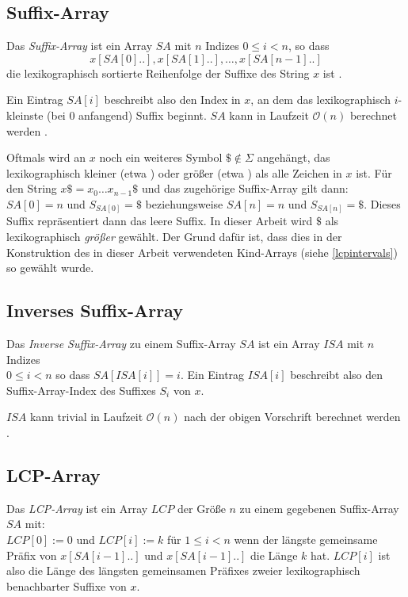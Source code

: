 \subsection{Suffix-Array}

Das \emph{Suffix-Array} ist ein Array $SA$ mit $n$ Indizes $0 \leq i < n$, so dass 
\begin{equation*}
	x[SA[0]..], x[SA[1]..], \dots, x[SA[n-1]..]
\end{equation*}
die lexikographisch sortierte Reihenfolge der Suffixe des String $x$ ist \cite{abouelhoda_replacing_2004, manber_suffix_1993}.

Ein Eintrag $SA[i]$ beschreibt also den Index in $x$, an dem das lexikographisch $i$-kleinste (bei $0$ anfangend) Suffix beginnt. $SA$ kann in Laufzeit $\mathcal{O}(n)$ berechnet werden \cite{nong_two_2011}. 

Oftmals wird an $x$ noch ein weiteres Symbol $\$ \notin \Sigma$ angehängt, das lexikographisch kleiner (etwa \cite{fischer_inducing_2011, nong_two_2011}) oder größer (etwa \cite{abouelhoda_optimal_2002}) als alle Zeichen in $x$ ist. Für den String $x\$ = x_0\dots x_{n-1} \$$ und das zugehörige Suffix-Array gilt dann: $SA[0] = n$ und $S_{SA[0]} = \$$ beziehungsweise $SA[n] = n$ und $S_{SA[n]} = \$$. 
Dieses Suffix repräsentiert dann das leere Suffix. In dieser Arbeit wird $\$$ als lexikographisch \textit{größer} gewählt. Der Grund dafür ist, dass dies in der Konstruktion des in dieser Arbeit verwendeten Kind-Arrays \cite{abouelhoda_optimal_2002} (siehe \autoref{lcpintervals}) so gewählt wurde. 

\subsection{Inverses Suffix-Array}

Das \emph{Inverse Suffix-Array} zu einem Suffix-Array $SA$ ist ein Array $ISA$ mit $n$ Indizes \\
$0 \leq i < n$ so dass $SA[ISA[i]] = i$.
Ein Eintrag $ISA[i]$ beschreibt also den Suffix-Array-Index des Suffixes $S_i$ von $x$.

$ISA$ kann trivial in Laufzeit $\mathcal{O}(n)$ nach der obigen Vorschrift berechnet werden \cite{abouelhoda_replacing_2004}.

\subsection{LCP-Array}

Das \emph{LCP-Array} ist ein Array $LCP$ der Größe $n$ zu einem gegebenen Suffix-Array $SA$ mit:\\
$LCP[0] := 0$ und $LCP[i] := k$ für $1 \leq i < n$ wenn der längste gemeinsame Präfix von $x[SA[i-1]..]$ und $x[SA[i-1]..]$ die Länge $k$ hat. $LCP[i]$ ist also die Länge des längsten gemeinsamen Präfixes zweier lexikographisch benachbarter Suffixe von $x$. 

